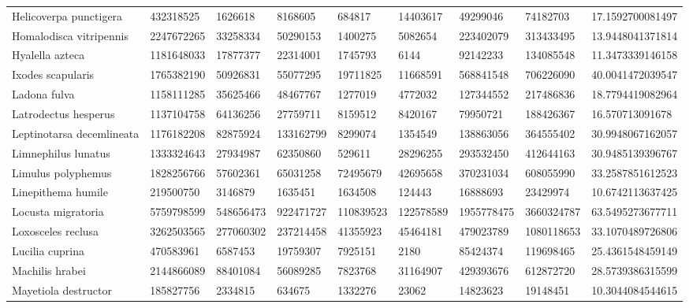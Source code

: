\begin{table}[]
\begin{tabular}{@{}lllllllll@{}}
Helicoverpa punctigera     & 432318525   & 1626618   & 8168605   & 684817    & 14403617  & 49299046   & 74182703   & 17.1592700081497  \\
Homalodisca vitripennis    & 2247672265  & 33258334  & 50290153  & 1400275   & 5082654   & 223402079  & 313433495  & 13.9448041371814  \\
Hyalella azteca            & 1181648033  & 17877377  & 22314001  & 1745793   & 6144      & 92142233   & 134085548  & 11.3473339146158  \\
Ixodes scapularis          & 1765382190  & 50926831  & 55077295  & 19711825  & 11668591  & 568841548  & 706226090  & 40.0041472039547  \\
Ladona fulva               & 1158111285  & 35625466  & 48467767  & 1277019   & 4772032   & 127344552  & 217486836  & 18.7794419082964  \\
Latrodectus hesperus       & 1137104758  & 64136256  & 27759711  & 8159512   & 8420167   & 79950721   & 188426367  & 16.570713091678   \\
Leptinotarsa decemlineata  & 1176182208  & 82875924  & 133162799 & 8299074   & 1354549   & 138863056  & 364555402  & 30.9948067162057  \\
Limnephilus lunatus        & 1333324643  & 27934987  & 62350860  & 529611    & 28296255  & 293532450  & 412644163  & 30.9485139396767  \\
Limulus polyphemus         & 1828256766  & 57602361  & 65031258  & 72495679  & 42695658  & 370231034  & 608055990  & 33.2587851612523  \\
Linepithema humile         & 219500750   & 3146879   & 1635451   & 1634508   & 124443    & 16888693   & 23429974   & 10.6742113637425  \\
Locusta migratoria         & 5759798599  & 548656473 & 922471727 & 110839523 & 122578589 & 1955778475 & 3660324787 & 63.5495273677711  \\
Loxosceles reclusa         & 3262503565  & 277060302 & 237214458 & 41355923  & 45464181  & 479023789  & 1080118653 & 33.1070489726806  \\
Lucilia cuprina            & 470583961   & 6587453   & 19759307  & 7925151   & 2180      & 85424374   & 119698465  & 25.4361548459149  \\
Machilis hrabei            & 2144866089  & 88401084  & 56089285  & 7823768   & 31164907  & 429393676  & 612872720  & 28.5739386315599  \\
Mayetiola destructor       & 185827756   & 2334815   & 634675    & 1332276   & 23062     & 14823623   & 19148451   & 10.3044084544615  \\

\end{tabular}
\end{table}
